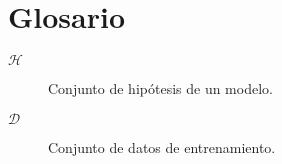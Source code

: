 
\chapter*{Glosario}

\begin{description} 
  \item[$\mathcal{H}$] Conjunto de hipótesis de un modelo.

  \item[$\mathcal{D}$] Conjunto de datos de entrenamiento.
\end{description}
\endinput
